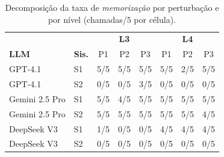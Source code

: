 \begin{table}[h]
\centering
\footnotesize
\caption{Decomposição da taxa de \emph{memorização} por perturbação e por nível (chamadas/$5$ por célula).}
\label{tab:sm_stress_break}
\begin{tabular}{l l ccc ccc}
\toprule
& & \multicolumn{3}{c}{\textbf{L3}} & \multicolumn{3}{c}{\textbf{L4}} \\
\textbf{LLM} & \textbf{Sis.} & P1 & P2 & P3 & P1 & P2 & P3 \\
\midrule
GPT-4.1 & S1 & 5/5 & 5/5 & 5/5 & 5/5 & 2/5 & 5/5 \\
GPT-4.1 & S2 & 0/5 & 0/5 & 3/5 & 0/5 & 0/5 & 0/5 \\
Gemini 2.5 Pro & S1 & 5/5 & 4/5 & 5/5 & 5/5 & 5/5 & 5/5 \\
Gemini 2.5 Pro & S2 & 5/5 & 5/5 & 5/5 & 5/5 & 5/5 & 4/5 \\
DeepSeek V3 & S1 & 1/5 & 0/5 & 0/5 & 4/5 & 4/5 & 4/5 \\
DeepSeek V3 & S2 & 0/5 & 0/5 & 0/5 & 0/5 & 0/5 & 0/5 \\
\bottomrule
\end{tabular}
\end{table}
